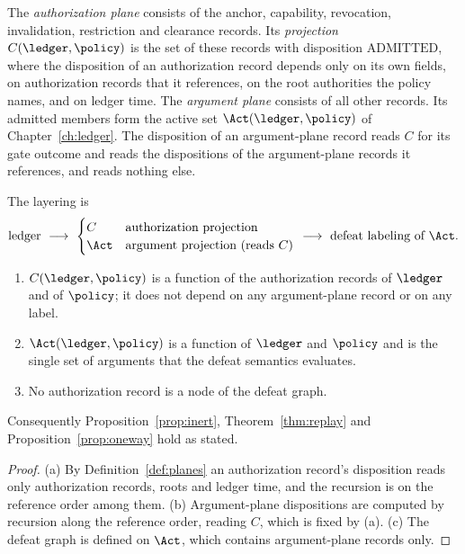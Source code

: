 \begin{definition}\label{def:planes}
The \emph{authorization plane} consists of the anchor, capability, revocation, invalidation, restriction and clearance records. Its \emph{projection} $C(\ledger,\policy)$ is the set of these records with disposition $\mathrm{ADMITTED}$, where the disposition of an authorization record depends only on its own fields, on authorization records that it references, on the root authorities the policy names, and on ledger time. The \emph{argument plane} consists of all other records. Its admitted members form the active set $\Act(\ledger,\policy)$ of Chapter~\ref{ch:ledger}. The disposition of an argument-plane record reads $C$ for its gate outcome and reads the dispositions of the argument-plane records it references, and reads nothing else.
\end{definition}

The layering is
\[
\text{ledger}\ \longrightarrow\ \begin{cases}C&\text{authorization projection}\\ \Act&\text{argument projection (reads }C\text{)}\end{cases}\ \longrightarrow\ \text{defeat labeling of }\Act.
\]

\begin{proposition}[Planes]\label{prop:planes}
\begin{enumerate}[label=(\alph*)]
\item $C(\ledger,\policy)$ is a function of the authorization records of $\ledger$ and of $\policy$; it does not depend on any argument-plane record or on any label.
\item $\Act(\ledger,\policy)$ is a function of $\ledger$ and $\policy$ and is the single set of arguments that the defeat semantics evaluates.
\item No authorization record is a node of the defeat graph.
\end{enumerate}
Consequently Proposition~\ref{prop:inert}, Theorem~\ref{thm:replay} and Proposition~\ref{prop:oneway} hold as stated.
\end{proposition}

\begin{proof}
(a) By Definition~\ref{def:planes} an authorization record's disposition reads only authorization records, roots and ledger time, and the recursion is on the reference order among them. (b) Argument-plane dispositions are computed by recursion along the reference order, reading $C$, which is fixed by (a). (c) The defeat graph is defined on $\Act$, which contains argument-plane records only.
\end{proof}

